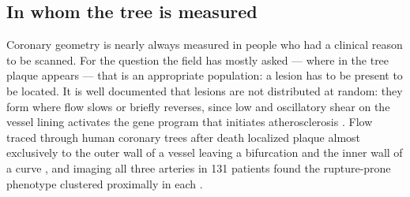 %

\subsection{In whom the tree is measured}
\label{sec:gap-whom}

Coronary geometry is nearly always measured in people who had a clinical reason to be scanned. For the question the field has mostly asked --- where in the tree plaque appears --- that is an
appropriate population: a lesion has to be present to be located.
It is well documented that lesions are not distributed at random: they form where flow slows or briefly reverses, since low and
oscillatory shear on the vessel lining activates the gene program that initiates atherosclerosis
\cite{chatzizisis2007ess}.
Flow traced through human coronary trees after death localized plaque almost exclusively to the
outer wall of a vessel leaving a bifurcation and the inner wall of a curve \cite{asakura1990flow},
and imaging all three arteries in 131 patients found the rupture-prone phenotype clustered
proximally in each \cite{araki2020plaques}.


